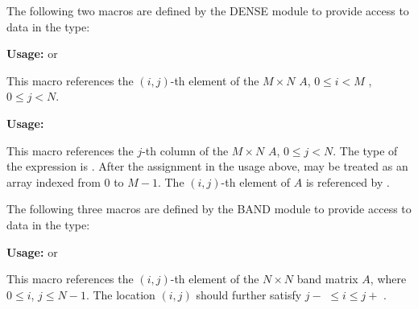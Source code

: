 \documentclass[letterpaper,10pt,english]{sphinxmanual}
\begin{document}
The following two macros are defined by the DENSE module to provide
access to data in the {\hyperref[linear_solvers/DLS:c.DlsMat]{\emph{}}} type:

\begin{fulllineitems}
\label{linear_solvers/DLS:c.DENSE_ELEM}
\textbf{Usage:}   or  

This macro references the \((i,j)\)-th element of the \(M \times N\)
{\hyperref[linear_solvers/DLS:c.DlsMat]{\emph{}}} \(A\), \(0 \le i < M\) , \(0 \le j < N\).

\end{fulllineitems}


\begin{fulllineitems}
\label{linear_solvers/DLS:c.DENSE_COL}
\textbf{Usage:} 

This macro references the \(j\)-th column of the \(M \times N\)
{\hyperref[linear_solvers/DLS:c.DlsMat]{\emph{}}} \(A\), \(0 \le j < N\). The type of the
expression  is  . After the
assignment in the usage above,  may be treated as an
array indexed from 0 to \(M-1\). The \((i,j)\)-th
element of \(A\) is referenced by .

\end{fulllineitems}


The following three macros are defined by the BAND module to provide
access to data in the {\hyperref[linear_solvers/DLS:c.DlsMat]{\emph{}}} type:

\begin{fulllineitems}
\label{linear_solvers/DLS:c.BAND_ELEM}
\textbf{Usage:}   or  

This macro references the \((i,j)\)-th element of the \(N \times N\)
band matrix \(A\), where \(0 \le i\), \(j \le N-1\).
The location \((i,j)\) should further satisfy \(j-\)
 \(\le i \le j+\) .

\end{fulllineitems}

\end{document}
